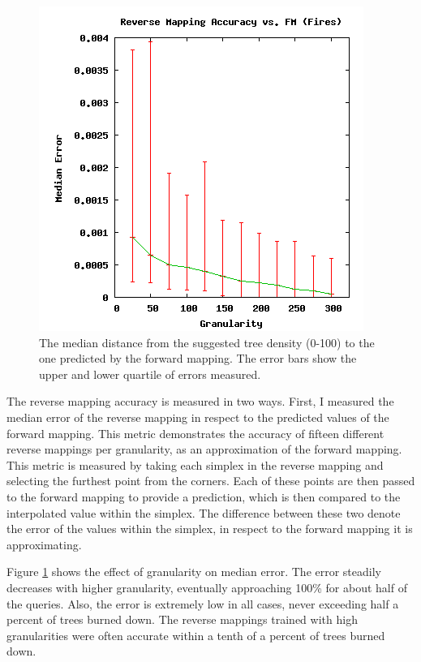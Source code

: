 \begin{figure}[ht]
\centering
\includegraphics[scale=.5]{images/results_fires/rmaccfm.png}
\caption{The median distance from the suggested tree density (0-100) to the one predicted by the forward mapping.
The error bars show the upper and lower quartile of errors measured.}
\label{fig:rmaccfm}
\end{figure}

The reverse mapping accuracy is measured in two ways.
First, I measured the median error of the reverse mapping in respect to the predicted values of the forward mapping.
This metric demonstrates the accuracy of fifteen different reverse mappings per granularity, as an approximation of the forward mapping.
This metric is measured by taking each simplex in the reverse mapping and selecting the furthest point from the corners.
Each of these points are then passed to the forward mapping to provide a prediction, which is then compared to the interpolated value within the simplex.
The difference between these two denote the error of the values within the simplex, in respect to the forward mapping it is approximating. 

Figure \ref{fig:rmaccfm} shows the effect of granularity on median error.
The error steadily decreases with higher granularity, eventually approaching 100\% for about half of the queries.
Also, the error is extremely low in all cases, never exceeding half a percent of trees burned down.
The reverse mappings trained with high granularities were often accurate within a tenth of a percent of trees burned down.

